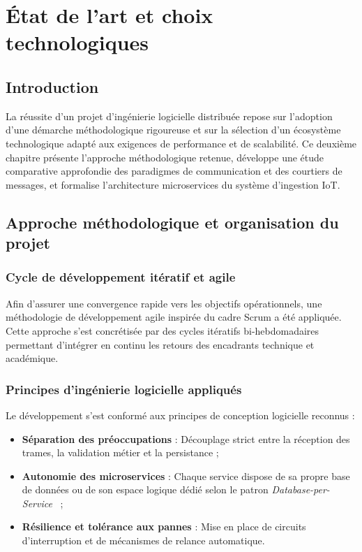\chapter{\'Etat de l'art et choix technologiques}
\finPageTitre

\section{Introduction}
La r\'eussite d'un projet d'ing\'enierie logicielle distribu\'ee repose sur l'adoption d'une d\'emarche m\'ethodologique rigoureuse et sur la s\'election d'un \'ecosyst\`eme technologique adapt\'e aux exigences de performance et de scalabilit\'e. Ce deuxi\`eme chapitre pr\'esente l'approche m\'ethodologique retenue, d\'eveloppe une \'etude comparative approfondie des paradigmes de communication et des courtiers de messages, et formalise l'architecture microservices du syst\`eme d'ingestion IoT.

\section{Approche m\'ethodologique et organisation du projet}
\subsection{Cycle de d\'eveloppement it\'eratif et agile}
Afin d'assurer une convergence rapide vers les objectifs op\'erationnels, une m\'ethodologie de d\'eveloppement agile inspir\'ee du cadre Scrum a \'et\'e appliqu\'ee. Cette approche s'est concr\'etis\'ee par des cycles it\'eratifs bi-hebdomadaires permettant d'int\'egrer en continu les retours des encadrants technique et acad\'emique.

\subsection{Principes d'ing\'enierie logicielle appliqu\'es}
Le d\'eveloppement s'est conform\'e aux principes de conception logicielle reconnus :
\begin{itemize}
    \item \textbf{S\'eparation des pr\'eoccupations} : D\'ecouplage strict entre la r\'eception des trames, la validation m\'etier et la persistance ;
    \item \textbf{Autonomie des microservices} : Chaque service dispose de sa propre base de donn\'ees ou de son espace logique d\'edi\'e selon le patron \textit{Database-per-Service}~\cite{richardson2018microservices} ;
    \item \textbf{R\'esilience et tol\'erance aux pannes} : Mise en place de circuits d'interruption et de m\'ecanismes de relance automatique.
\end{itemize}

